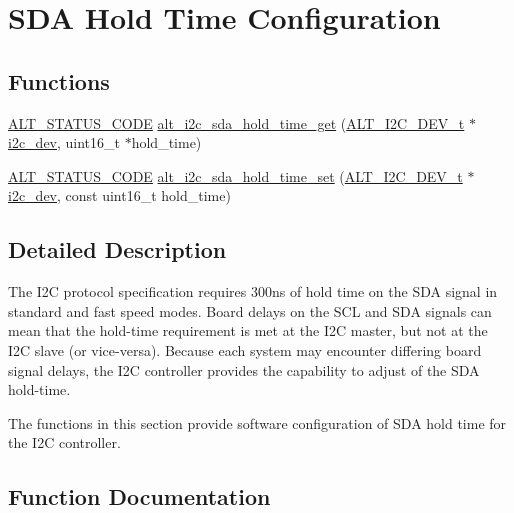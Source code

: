 \hypertarget{group__ALT__I2C__SDA__HOLD}{}\section{S\+DA Hold Time Configuration}
\label{group__ALT__I2C__SDA__HOLD}
\subsection*{Functions}
\begin{DoxyCompactItemize}
\item 
\mbox{\hyperlink{hwlib_8h_abdb0d369f069723ca55d6c94bcaaaa12}{A\+L\+T\+\_\+\+S\+T\+A\+T\+U\+S\+\_\+\+C\+O\+DE}} \mbox{\hyperlink{group__ALT__I2C__SDA__HOLD_ga0aa85561acfa2b054283557208be0b46}{alt\+\_\+i2c\+\_\+sda\+\_\+hold\+\_\+time\+\_\+get}} (\mbox{\hyperlink{structALT__I2C__DEV__s}{A\+L\+T\+\_\+\+I2\+C\+\_\+\+D\+E\+V\+\_\+t}} $\ast$\mbox{\hyperlink{structi2c__dev}{i2c\+\_\+dev}}, uint16\+\_\+t $\ast$hold\+\_\+time)
\item 
\mbox{\hyperlink{hwlib_8h_abdb0d369f069723ca55d6c94bcaaaa12}{A\+L\+T\+\_\+\+S\+T\+A\+T\+U\+S\+\_\+\+C\+O\+DE}} \mbox{\hyperlink{group__ALT__I2C__SDA__HOLD_ga9e5a55cd63be05ba095bb53448c1aeee}{alt\+\_\+i2c\+\_\+sda\+\_\+hold\+\_\+time\+\_\+set}} (\mbox{\hyperlink{structALT__I2C__DEV__s}{A\+L\+T\+\_\+\+I2\+C\+\_\+\+D\+E\+V\+\_\+t}} $\ast$\mbox{\hyperlink{structi2c__dev}{i2c\+\_\+dev}}, const uint16\+\_\+t hold\+\_\+time)
\end{DoxyCompactItemize}


\subsection{Detailed Description}
The I2C protocol specification requires 300ns of hold time on the S\+DA signal in standard and fast speed modes. Board delays on the S\+CL and S\+DA signals can mean that the hold-\/time requirement is met at the I2C master, but not at the I2C slave (or vice-\/versa). Because each system may encounter differing board signal delays, the I2C controller provides the capability to adjust of the S\+DA hold-\/time.

The functions in this section provide software configuration of S\+DA hold time for the I2C controller. 

\subsection{Function Documentation}
\mbox{\label{group__ALT__I2C__SDA__HOLD_ga0aa85561acfa2b054283557208be0b46}} 
